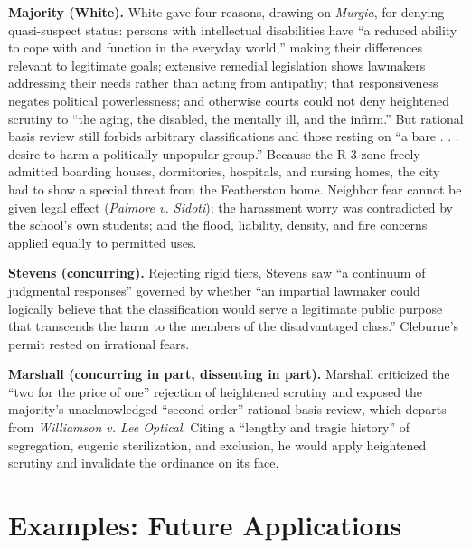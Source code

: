 \documentclass[12pt]{article}
\begin{document}
\textbf{Majority (White).} White gave four reasons, drawing on \textit{Murgia}, for denying quasi-suspect status: persons with intellectual disabilities have ``a reduced ability to cope with and function in the everyday world,'' making their differences relevant to legitimate goals; extensive remedial legislation shows lawmakers addressing their needs rather than acting from antipathy; that responsiveness negates political powerlessness; and otherwise courts could not deny heightened scrutiny to ``the aging, the disabled, the mentally ill, and the infirm.'' But rational basis review still forbids arbitrary classifications and those resting on ``a bare . . . desire to harm a politically unpopular group.'' Because the R-3 zone freely admitted boarding houses, dormitories, hospitals, and nursing homes, the city had to show a special threat from the Featherston home. Neighbor fear cannot be given legal effect (\textit{Palmore v. Sidoti}); the harassment worry was contradicted by the school's own students; and the flood, liability, density, and fire concerns applied equally to permitted uses.

\textbf{Stevens (concurring).} Rejecting rigid tiers, Stevens saw ``a continuum of judgmental responses'' governed by whether ``an impartial lawmaker could logically believe that the classification would serve a legitimate public purpose that transcends the harm to the members of the disadvantaged class.'' Cleburne's permit rested on irrational fears.

\textbf{Marshall (concurring in part, dissenting in part).} Marshall criticized the ``two for the price of one'' rejection of heightened scrutiny and exposed the majority's unacknowledged ``second order'' rational basis review, which departs from \textit{Williamson v. Lee Optical}. Citing a ``lengthy and tragic history'' of segregation, eugenic sterilization, and exclusion, he would apply heightened scrutiny and invalidate the ordinance on its face.

\section{Examples: Future Applications}
\end{document}
